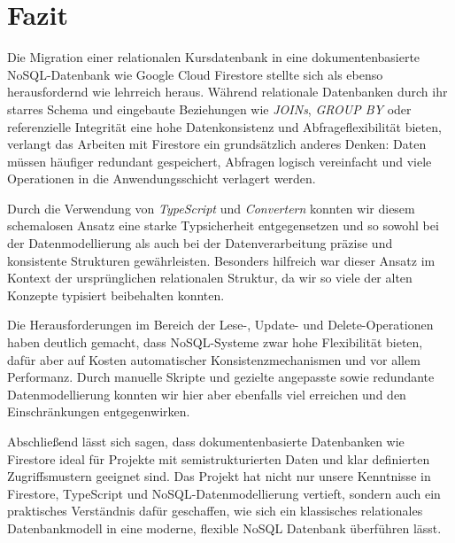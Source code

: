 \documentclass[12pt,a4paper%
              ,oneside     %
              ,titlepage
              ,DIV=13
              ,headinclude
              ,footinclude=false%
              ,cleardoublepage=empty%
              ,parskip=half,
              BCOR=0mm,
              ]{scrreprt}
\begin{document}
\chapter{Fazit}

Die Migration einer relationalen Kursdatenbank in eine dokumentenbasierte NoSQL-Datenbank wie Google Cloud Firestore stellte sich als ebenso herausfordernd wie lehrreich heraus. Während relationale Datenbanken durch ihr starres Schema und eingebaute Beziehungen wie \textit{JOINs}, \textit{GROUP BY} oder referenzielle Integrität eine hohe Datenkonsistenz und Abfrageflexibilität bieten, verlangt das Arbeiten mit Firestore ein grundsätzlich anderes Denken: Daten müssen häufiger redundant gespeichert, Abfragen logisch vereinfacht und viele Operationen in die Anwendungsschicht verlagert werden.

Durch die Verwendung von \textit{TypeScript} und \textit{Convertern} konnten wir diesem schemalosen Ansatz eine starke Typsicherheit entgegensetzen und so sowohl bei der Datenmodellierung als auch bei der Datenverarbeitung präzise und konsistente Strukturen gewährleisten. Besonders hilfreich war dieser Ansatz im Kontext der ursprünglichen relationalen Struktur, da wir so viele der alten Konzepte typisiert beibehalten konnten.

Die Herausforderungen im Bereich der Lese-, Update- und Delete-Operationen haben deutlich gemacht, dass NoSQL-Systeme zwar hohe Flexibilität bieten, dafür aber auf Kosten automatischer Konsistenzmechanismen und vor allem Performanz. Durch manuelle Skripte und gezielte angepasste sowie redundante Datenmodellierung konnten wir hier aber ebenfalls viel erreichen und den Einschränkungen entgegenwirken.

Abschließend lässt sich sagen, dass dokumentenbasierte Datenbanken wie Firestore ideal für Projekte mit semistrukturierten Daten und klar definierten Zugriffsmustern geeignet sind. Das Projekt hat nicht nur unsere Kenntnisse in Firestore, TypeScript und NoSQL-Datenmodellierung vertieft, sondern auch ein praktisches Verständnis dafür geschaffen, wie sich ein klassisches relationales Datenbankmodell in eine moderne, flexible NoSQL Datenbank überführen lässt.


\appendix




\renewcommand{\bibfont}{\footnotesize}
\printbibliography[title={Literaturverzeichnis}, 
                   heading=bibintoc]


{ %
\printindex
}
\end{document}
